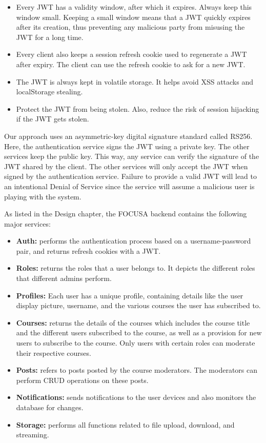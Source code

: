 \begin{itemize}
    \item Every JWT has a validity window, after which it expires. Always keep this window small. 
    Keeping a small window means that a JWT quickly expires after its creation, thus preventing any malicious party from misusing the JWT for a long time.
    \item Every client also keeps a session refresh cookie used to regenerate a JWT after expiry. The client can use the refresh cookie to ask for a new JWT.
    \item The JWT is always kept in volatile storage. It helps avoid XSS attacks and localStorage stealing.
    \item Protect the JWT from being stolen. Also, reduce the risk of session hijacking if the JWT gets stolen.
\end{itemize}

Our approach uses an asymmetric-key digital signature standard called RS256. Here, the authentication service signs the JWT using a private key. The other services keep the public key. This way, any service can verify the signature of the JWT shared by the client. The other services will only accept the JWT when signed by the authentication service. 
Failure to provide a valid JWT will lead to an intentional Denial of Service since the service will assume a malicious user is playing with the system.

As listed in the Design chapter, the FOCUSA backend contains the following major services:
\begin{itemize}
    \item \textbf{Auth:} performs the authentication process based on a username-password pair, and returns refresh cookies with a JWT.
    \item \textbf{Roles:}  returns the roles that a user belongs to. It depicts the different roles that different admins perform.
    \item \textbf{Profiles:} Each user has a unique profile, containing details like the user display picture, username, and the various courses the user has subscribed to.
    \item \textbf{Courses:}  returns the details of the courses which includes the course title and the different users subscribed to the course, as well as a provision for new users to subscribe to the course. Only users with certain roles can moderate their respective courses.
    \item \textbf{Posts:} refers to posts posted by the course moderators. The moderators can perform CRUD operations on these posts.
    \item \textbf{Notifications:}  sends notifications to the user devices and also monitors the database for changes.
    \item \textbf{Storage:} performs all functions related to file upload, download, and streaming.
\end{itemize}


